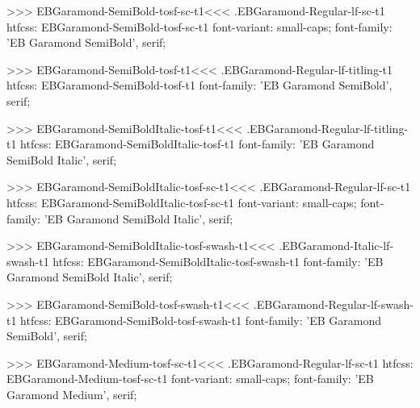 {{{{{{{>>>
\<EBGaramond-SemiBold-tosf-sc-t1\><<<
.EBGaramond-Regular-lf-sc-t1
htfcss:  EBGaramond-SemiBold-tosf-sc-t1  font-variant: small-caps; font-family: 'EB Garamond SemiBold', serif;

>>>
\<EBGaramond-SemiBold-tosf-t1\><<<
.EBGaramond-Regular-lf-titling-t1
htfcss:  EBGaramond-SemiBold-tosf-t1  font-family: 'EB Garamond SemiBold', serif;

>>>
\<EBGaramond-SemiBoldItalic-tosf-t1\><<<
.EBGaramond-Regular-lf-titling-t1
htfcss:  EBGaramond-SemiBoldItalic-tosf-t1  font-family: 'EB Garamond SemiBold Italic', serif;

>>>
\<EBGaramond-SemiBoldItalic-tosf-sc-t1\><<<
.EBGaramond-Regular-lf-sc-t1
htfcss:  EBGaramond-SemiBoldItalic-tosf-sc-t1  font-variant: small-caps; font-family: 'EB Garamond SemiBold Italic', serif;

>>>
\<EBGaramond-SemiBoldItalic-tosf-swash-t1\><<<
.EBGaramond-Italic-lf-swash-t1
htfcss:  EBGaramond-SemiBoldItalic-tosf-swash-t1  font-family: 'EB Garamond SemiBold Italic', serif;

>>>
\<EBGaramond-SemiBold-tosf-swash-t1\><<<
.EBGaramond-Regular-lf-swash-t1
htfcss:  EBGaramond-SemiBold-tosf-swash-t1  font-family: 'EB Garamond SemiBold', serif;

>>>
\<EBGaramond-Medium-tosf-sc-t1\><<<
.EBGaramond-Regular-lf-sc-t1
htfcss:  EBGaramond-Medium-tosf-sc-t1  font-variant: small-caps; font-family: 'EB Garamond Medium', serif;

}}}}}}}
